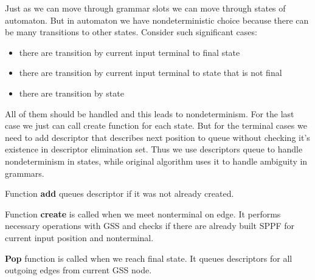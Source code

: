 \documentclass[runningheads,a4paper]{llncs}
\begin{document}
Just as we can move through grammar slots we can move through states 
of automaton. But in automaton we have nondeterministic choice because there can be 
many transitions to other states. Consider such significant cases:
\begin{itemize} 
\item there are transition by current input terminal to final state
\item there are transition by current input terminal to state that is not final
\item there are transition by state
\end{itemize}
All of them should be handled and this leads to nondeterminism. 
For the last case we just can call create function for each state.
But for the terminal cases we need to add descriptor that describes
next position to queue without checking it's existence in descriptor elimination set.
Thus we use descriptors queue to handle nondeterminism in states, while original algorithm uses it to 
handle ambiguity in grammars.




Function \textbf{add} queues descriptor if it was not already created.


Function \textbf{create} is called when we meet nonterminal on edge.
It performs necessary operations with GSS and checks if there are already built SPPF for current
input position and nonterminal.

\textbf{Pop} function is called when we reach final state. It queues descriptors for all outgoing edges from current GSS node.


\end{document}
